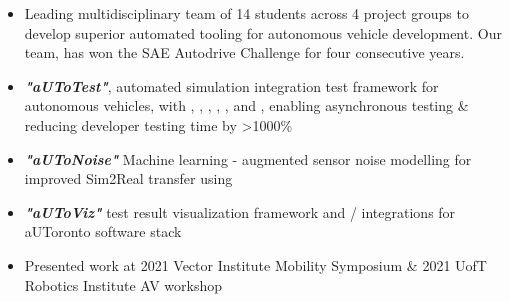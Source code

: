 \documentclass[10pt,a4paper,ragged2e,withhyper]{altacv}
\newcommand{\chref}[3][teal]{\href{#2}{\color{#1}{#3}}}%
\begin{document}
\begin{itemize}
  \item Leading multidisciplinary team of 14 students across 4 project groups to develop superior automated tooling for autonomous vehicle development. Our team, \chref{https://www.autodrive.utoronto.ca/}{aUToronto} has won the SAE Autodrive Challenge for four consecutive years.
  \item \textbf{\textit{"aUToTest"}}, automated simulation integration test framework for autonomous vehicles, with , , , , , and , enabling asynchronous testing \& reducing developer testing time by >1000\%
  \item \textbf{\textit{"aUToNoise"}} Machine learning - augmented sensor noise modelling for improved Sim2Real transfer using 
  \item \textbf{\textit{"aUToViz"}} test result visualization framework and /  integrations for aUToronto software stack
  \item Presented work at 2021 Vector Institute Mobility Symposium \& 2021 UofT Robotics Institute AV workshop

\end{itemize}

\end{document}
